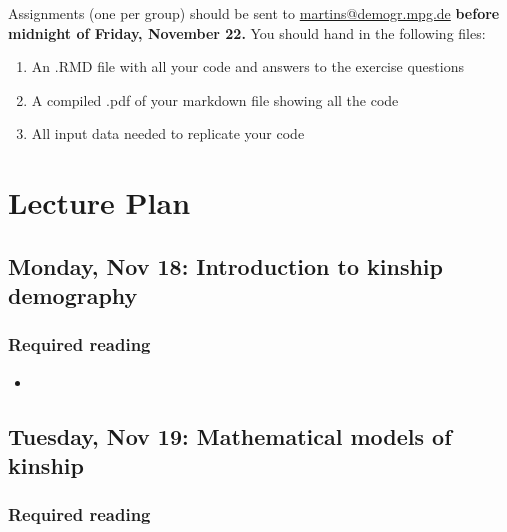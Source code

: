 \documentclass{article}
\begin{document}
Assignments (one per group) should be sent to \href{mailto:martins@demogr.mpg.de}{martins@demogr.mpg.de} \textbf{before midnight of Friday, November 22.} 
You should hand in the following files:
\begin{enumerate}
    \item An .RMD file with all your code and answers to the exercise questions
    \item A compiled .pdf of your markdown file showing all the code
    \item All input data needed to replicate your code 
\end{enumerate}


\section{Lecture Plan}

\subsection*{Monday, Nov 18: Introduction to kinship demography}

\subsubsection*{Required reading}

\begin{itemize}
    \item {}
\end{itemize}



\subsection*{Tuesday, Nov 19: Mathematical models of kinship}

\subsubsection*{Required reading}
\end{document}
